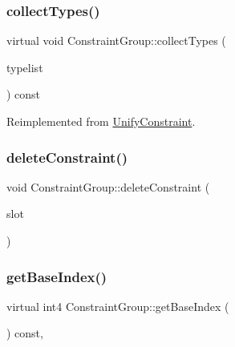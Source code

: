 \subsubsection{\texorpdfstring{collectTypes()}{collectTypes()}}
{\footnotesize\ttfamily virtual void Constraint\+Group\+::collect\+Types (\begin{DoxyParamCaption}\item[{vector$<$ \mbox{\hyperlink{class_unify_datatype}{Unify\+Datatype}} $>$ \&}]{typelist }\end{DoxyParamCaption}) const\hspace{0.3cm}{\ttfamily [virtual]}}



Reimplemented from \mbox{\hyperlink{class_unify_constraint_acb83b6bea3b21e13054e72ac9cfaba0f}{Unify\+Constraint}}.

\mbox{\label{class_constraint_group_a01c6e43bddd0906eae93f915db6375d4}} 
\subsubsection{\texorpdfstring{deleteConstraint()}{deleteConstraint()}}
{\footnotesize\ttfamily void Constraint\+Group\+::delete\+Constraint (\begin{DoxyParamCaption}\item[{int4}]{slot }\end{DoxyParamCaption})}

\mbox{\label{class_constraint_group_a50158935682afb1c1838a2d284f18ed4}} 
\subsubsection{\texorpdfstring{getBaseIndex()}{getBaseIndex()}}
{\footnotesize\ttfamily virtual int4 Constraint\+Group\+::get\+Base\+Index (\begin{DoxyParamCaption}\item[{void}]{ }\end{DoxyParamCaption}) const\hspace{0.3cm}{\ttfamily [inline]}, {\ttfamily [virtual]}}



